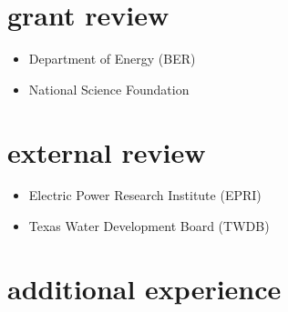 \documentclass[10pt,oneside]{article}
\begin{document}

\section{grant review}

\mbox{}\vspace{-\dimexpr\baselineskip\relax}

\begin{itemize}[label={}]
  
  \item Department of Energy (BER)
        
  \item National Science Foundation
        
\end{itemize}


\section{external review}

\mbox{}\vspace{-\dimexpr\baselineskip\relax}

\begin{itemize}[label={}]
  
  \item Electric Power Research Institute (EPRI)
        
  \item Texas Water Development Board (TWDB)
        
\end{itemize}


\section{additional experience}

\mbox{}\vspace{-\dimexpr\baselineskip\relax}
\end{document}
